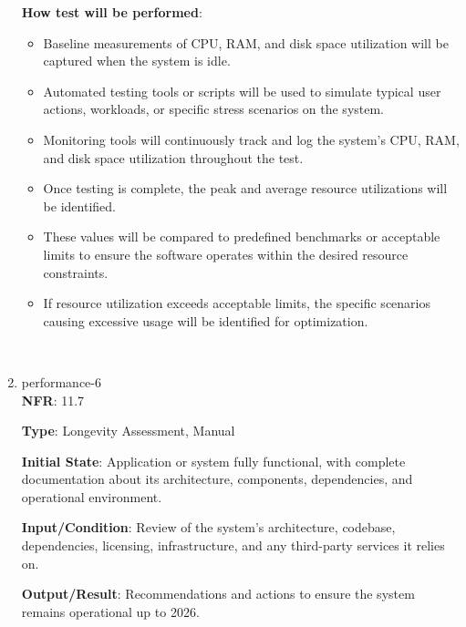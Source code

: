 \documentclass[12pt, titlepage]{article}
\begin{document}
\begin{enumerate}
\textbf{How test will be performed}: 
\begin{itemize}[noitemsep]
    \item Baseline measurements of CPU, RAM, and disk space utilization will be captured when the system is idle.
    \item Automated testing tools or scripts will be used to simulate typical user actions, workloads, or specific stress scenarios on the system.
    \item Monitoring tools will continuously track and log the system's CPU, RAM, and disk space utilization throughout the test.
    \item Once testing is complete, the peak and average resource utilizations will be identified.
    \item These values will be compared to predefined benchmarks or acceptable limits to ensure the software operates within the desired resource constraints.
    \item If resource utilization exceeds acceptable limits, the specific scenarios causing excessive usage will be identified for optimization.
\end{itemize}\\

\item{performance-6 \\}
\textbf{NFR}: 11.7

\textbf{Type}: Longevity Assessment, Manual

\textbf{Initial State}: Application or system fully functional, with complete documentation about its architecture, components, dependencies, and operational environment.

\textbf{Input/Condition}: Review of the system's architecture, codebase, dependencies, licensing, infrastructure, and any third-party services it relies on.

\textbf{Output/Result}: Recommendations and actions to ensure the system remains operational up to 2026.


\end{enumerate}
\end{document}
